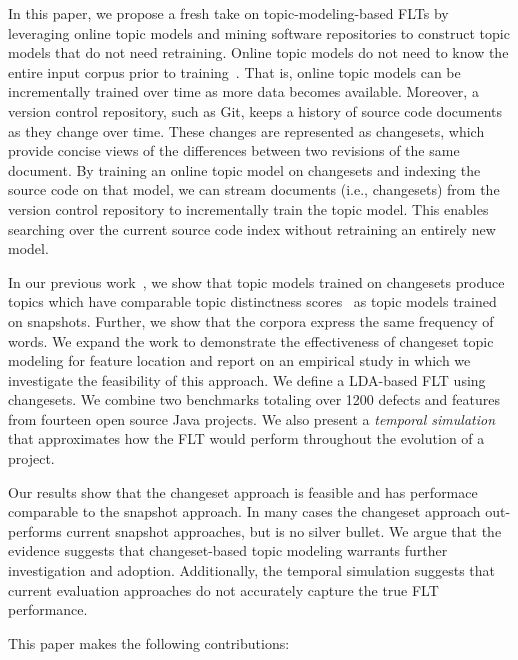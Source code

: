 In this paper, we propose a fresh take on topic-modeling-based FLTs by
leveraging online topic models and mining software repositories to construct
topic models that do not need retraining.  Online topic models do not need to
know the entire input corpus prior to
training~\cite{Hoffman-etal:2010}.  That is, online topic models can
be incrementally trained over time as more data becomes available.
Moreover, a version control repository, such as Git, keeps a history of source
code documents as they change over time.  These changes are represented as
changesets, which provide concise views of the differences between two revisions
of the same document.  By training an online topic model on changesets and
indexing the source code on that model, we can stream documents (i.e.,
changesets) from the version control repository to incrementally train the topic
model.  This enables searching over the current source code index without
retraining an entirely new model.

In our previous work~\cite{Corley-etal:2014}, we show that topic models trained
on changesets produce topics which have comparable topic distinctness
scores~\cite{Thomas-etal:2011} as topic models trained on snapshots.  Further,
we show that the corpora express the same frequency of words.  We expand the
work to demonstrate the effectiveness of changeset topic modeling for feature
location and report on an empirical study in which we investigate the
feasibility of this approach.
We define a LDA-based FLT using changesets.  We combine two benchmarks totaling
over 1200 defects and features from fourteen open source Java projects.  We also
present a \emph{temporal simulation} that approximates how the FLT would perform
throughout the evolution of a project.

Our results show that the changeset approach is feasible and has performace
comparable to the snapshot approach.  In many cases the changeset approach
out-performs current snapshot approaches, but is no silver bullet.  We argue
that the evidence suggests that changeset-based topic modeling warrants further
investigation and adoption.  Additionally, the temporal simulation suggests that
current evaluation approaches do not accurately capture the true FLT
performance.

This paper makes the following contributions:

